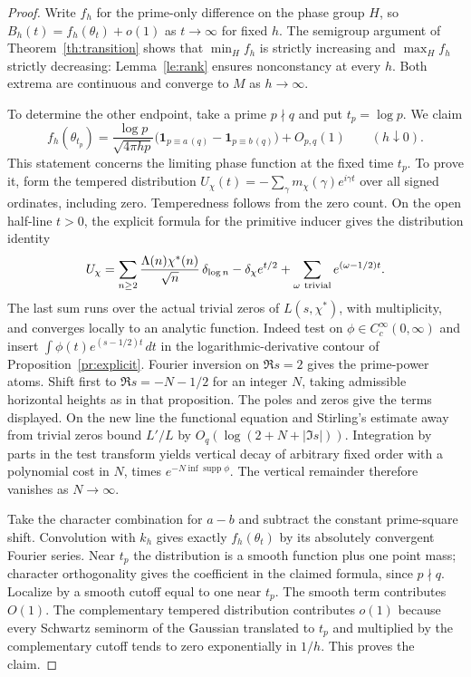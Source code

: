 \begin{proof}
Write $f_h$ for the prime-only difference on the phase group $H$,
so $B_h(t)=f_h(\theta_t)+o(1)$ as $t\to\infty$ for fixed $h$.
The semigroup argument of Theorem~\ref{th:transition} shows that
$\min_H f_h$ is strictly increasing and $\max_H f_h$ strictly decreasing:
Lemma~\ref{le:rank} ensures nonconstancy at every $h$.
Both extrema are continuous and converge to $M$ as $h\to\infty$.

To determine the other endpoint, take a prime $p\nmid q$ and put
$t_p=\log p$. We claim
\[
 f_h(\theta_{t_p})=
 \frac{\log p}{\sqrt{4\pi h p}}
  \bigl(\mathbf 1_{p\equiv a\,(q)}-\mathbf 1_{p\equiv b\,(q)}\bigr)
       +O_{p,q}(1) \qquad (h\downarrow0).
\]
This statement concerns the limiting phase function at the fixed time
$t_p$. To prove it, form the tempered distribution
$U_\chi(t)=-\sum_\gamma m_\chi(\gamma)e^{i\gamma t}$
over all signed ordinates, including zero. Temperedness follows from
the zero count. On the open half-line $t>0$, the explicit formula
for the primitive inducer gives the distribution identity
\[
 U_\chi=
 \sum_{n\ge2}\frac{\Lambda(n)\chi^*(n)}{\sqrt n}\,\delta_{\log n}
 -\delta_\chi e^{t/2}
 +\sum_{\omega\ {\rm trivial}}e^{(\omega-1/2)t}.
\]
The last sum runs over the actual trivial zeros of $L(s,\chi^*)$,
with multiplicity, and converges locally to an analytic function.
Indeed test on $\phi\in C_c^\infty(0,\infty)$ and insert
$\int\phi(t)e^{(s-1/2)t}\,dt$ in the logarithmic-derivative contour
of Proposition~\ref{pr:explicit}. Fourier inversion on $\Re s=2$
gives the prime-power atoms. Shift first to $\Re s=-N-1/2$ for an
integer $N$, taking admissible horizontal heights as in that proposition.
The poles and zeros give the terms displayed. On the new line the
functional equation and Stirling's estimate away from trivial zeros
bound $L'/L$ by $O_q(\log(2+N+|\Im s|))$. Integration by parts in the
test transform yields vertical decay of arbitrary fixed order with a
polynomial cost in $N$, times $e^{-N\inf\operatorname{supp}\phi}$.
The vertical remainder therefore vanishes as $N\to\infty$.

Take the character combination for $a-b$ and subtract the constant
prime-square shift. Convolution with $k_h$ gives exactly
$f_h(\theta_t)$ by its absolutely convergent Fourier series. Near
$t_p$ the distribution is a smooth function plus one point mass;
character orthogonality gives the coefficient in the claimed formula,
since $p\nmid q$. Localize by a smooth cutoff equal to one near $t_p$.
The smooth term contributes $O(1)$. The complementary tempered
distribution contributes $o(1)$ because every Schwartz seminorm of the
Gaussian translated to $t_p$ and multiplied by the complementary
cutoff tends to zero exponentially in $1/h$. This proves the claim.


\end{proof}
